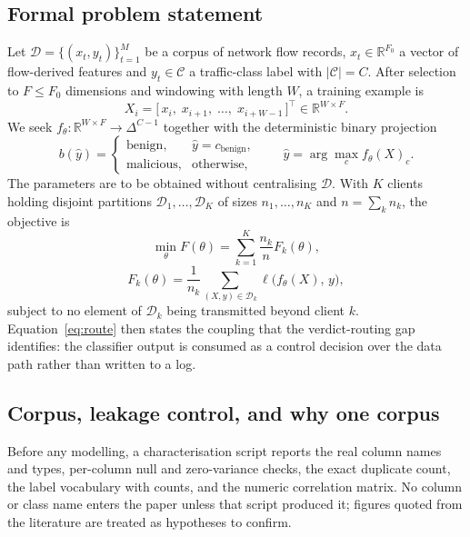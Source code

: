 \documentclass[conference]{IEEEtran}
\begin{document}
\subsection{Formal problem statement}\label{sec:formal}
Let $\mathcal{D} = \{(x_t, y_t)\}_{t=1}^{M}$ be a corpus of network flow records, $x_t \in
\mathbb{R}^{F_0}$ a vector of flow-derived features and $y_t \in \mathcal{C}$ a traffic-class
label with $|\mathcal{C}| = C$. After selection to $F \le F_0$ dimensions and windowing with
length $W$, a training example is
\begin{equation}
X_i = \big[\, x_i,\; x_{i+1},\; \dots,\; x_{i+W-1} \,\big]^{\top} \in \mathbb{R}^{W \times F}.
\label{eq:window}
\end{equation}
We seek $f_\theta : \mathbb{R}^{W \times F} \to \Delta^{C-1}$ together with the deterministic
binary projection
\begin{equation}
b(\hat{y}) =
\begin{cases}
\text{benign}, & \hat{y} = c_{\text{benign}},\\
\text{malicious}, & \text{otherwise},
\end{cases}
\qquad \hat{y} = \arg\max_c f_\theta(X)_c .
\label{eq:binproj}
\end{equation}
The parameters are to be obtained without centralising $\mathcal{D}$. With $K$ clients holding
disjoint partitions $\mathcal{D}_1,\dots,\mathcal{D}_K$ of sizes $n_1,\dots,n_K$ and
$n = \sum_k n_k$, the objective is
\begin{equation}
\min_{\theta} F(\theta) = \sum_{k=1}^{K} \frac{n_k}{n} F_k(\theta),
\label{eq:fedobj}
\end{equation}
\begin{equation}
F_k(\theta) = \frac{1}{n_k} \sum_{(X,y) \in \mathcal{D}_k} \ell\big(f_\theta(X),\, y\big),
\label{eq:localobj}
\end{equation}
subject to no element of $\mathcal{D}_k$ being transmitted beyond client $k$. Equation~\eqref{eq:route}
then states the coupling that the verdict-routing gap identifies: the classifier output is consumed
as a control decision over the data path rather than written to a log.

\subsection{Corpus, leakage control, and why one corpus}\label{sec:data}
Before any modelling, a characterisation script reports the real column names and types,
per-column null and zero-variance checks, the exact duplicate count, the label vocabulary with
counts, and the numeric correlation matrix. No column or class name enters the paper unless that
script produced it; figures quoted from the literature are treated as hypotheses to confirm.
\end{document}

